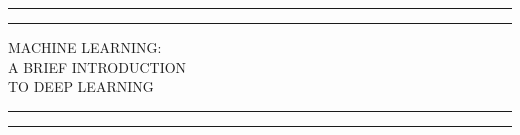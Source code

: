\documentclass[12pt]{article}
\begin{document}
\begin{titlepage} %

	\centering %
	
	\scshape %
	
	\vspace*{\baselineskip} %
	
	
	\rule{\textwidth}{1.6pt}\vspace*{-\baselineskip}\vspace*{2pt} %
	\rule{\textwidth}{0.4pt} %
	
	\vspace{0.75\baselineskip} %
	{\LARGE MACHINE LEARNING: }\\
	{\LARGE A BRIEF INTRODUCTION\\} %
	\vspace{0.45\baselineskip}
	{\LARGE TO DEEP LEARNING}
	\vspace{0.75\baselineskip} %
	
	\rule{\textwidth}{0.4pt}\vspace*{-\baselineskip}\vspace{3.2pt} %
	\rule{\textwidth}{1.6pt} %
	
	\vspace{2\baselineskip} %
	
	
    \begin{center}
    
    \vspace{0.5\baselineskip} %
	

\end{center}
\end{titlepage}
\end{document}
